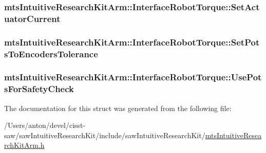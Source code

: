 \subsubsection[{Set\+Actuator\+Current}]{ mts\+Intuitive\+Research\+Kit\+Arm\+::\+Interface\+Robot\+Torque\+::\+Set\+Actuator\+Current}\label{structmts_intuitive_research_kit_arm_1_1_interface_robot_torque_a67685d0499c298985fa6dff4c8c3a85b}
\hypertarget{structmts_intuitive_research_kit_arm_1_1_interface_robot_torque_a53b75a3db7f1bbabb04430f347691e66}{}
\subsubsection[{Set\+Pots\+To\+Encoders\+Tolerance}]{ mts\+Intuitive\+Research\+Kit\+Arm\+::\+Interface\+Robot\+Torque\+::\+Set\+Pots\+To\+Encoders\+Tolerance}\label{structmts_intuitive_research_kit_arm_1_1_interface_robot_torque_a53b75a3db7f1bbabb04430f347691e66}
\hypertarget{structmts_intuitive_research_kit_arm_1_1_interface_robot_torque_a33c894c1024853e9cbc7f496b2e05199}{}
\subsubsection[{Use\+Pots\+For\+Safety\+Check}]{ mts\+Intuitive\+Research\+Kit\+Arm\+::\+Interface\+Robot\+Torque\+::\+Use\+Pots\+For\+Safety\+Check}\label{structmts_intuitive_research_kit_arm_1_1_interface_robot_torque_a33c894c1024853e9cbc7f496b2e05199}


The documentation for this struct was generated from the following file\+:\begin{DoxyCompactItemize}
\item 
/\+Users/anton/devel/cisst-\/saw/saw\+Intuitive\+Research\+Kit/include/saw\+Intuitive\+Research\+Kit/\hyperlink{mts_intuitive_research_kit_arm_8h}{mts\+Intuitive\+Research\+Kit\+Arm.\+h}\end{DoxyCompactItemize}
